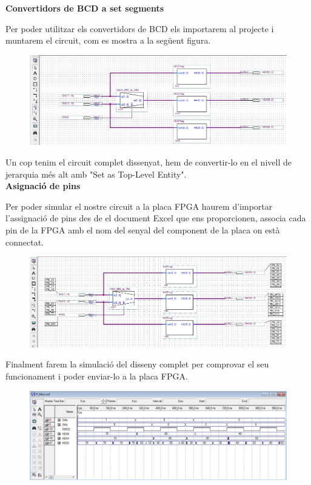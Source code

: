 \documentclass[12pt, a4papre]{article}
\begin{document}
	\textbf{\large{Convertidors de BCD a set segments}}
	
	Per poder utilitzar els convertidors de BCD els importarem al projecte i muntarem el circuit, com es mostra a la següent figura.
	
	\begin{figure}[H]
		\begin{center}
		\includegraphics[width=150mm]{bcd7.jpeg}
		\end{center}
	\end{figure}
	
	Un cop tenim el circuit complet dissenyat, hem de convertir-lo en el nivell de jerarquia més
alt amb "Set as Top-Level Entity".\\

	
	\textbf{\large{Asignació de pins}}	
	
	Per poder simular el nostre circuit a la placa FPGA haurem d'importar l'assignació de pins des de el document Excel que ens proporcionen, associa cada pin de la FPGA amb el nom del senyal del component de la placa on està connectat.
	\begin{figure}[H]
		\begin{center}
		\includegraphics[width=150mm]{bcd7segasign.jpeg}
		\end{center}
	\end{figure}
	
	Finalment farem la simulació del disseny complet per comprovar el seu funcionament i poder enviar-lo a la placa FPGA.
	\begin{figure}[H]
		\begin{center}
		\includegraphics[width=150mm]{simulfinal.jpeg}
		\end{center}
	\end{figure}
	
\end{document}
